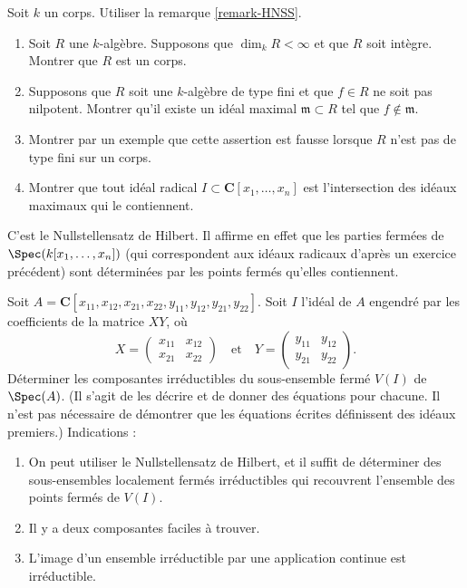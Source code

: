 \begin{exercise}
\label{exercise-Hilbert-Nullstellensatz}
Soit $k$ un corps. Utiliser la remarque \ref{remark-HNSS}.
\begin{enumerate}
\item Soit $R$ une $k$-algèbre. Supposons que $\dim_k R < \infty$
et que $R$ soit intègre. Montrer que $R$ est un corps.
\item Supposons que $R$ soit une $k$-algèbre de type fini et que
$f\in R$ ne soit pas nilpotent. Montrer qu'il existe un idéal maximal
${\mathfrak m} \subset R$ tel que $f\not\in {\mathfrak m}$.
\item Montrer par un exemple que cette assertion est fausse lorsque $R$
n'est pas de type fini sur un corps.
\item Montrer que tout idéal radical $I \subset {\mathbf C}[x_1, \ldots, x_n]$
est l'intersection des idéaux maximaux qui le contiennent.
\end{enumerate}
\end{exercise}

\begin{remark}
\label{remark-Hilbert-Nullstellensatz}
C'est le Nullstellensatz de Hilbert. Il affirme en effet
que les parties fermées de $\Spec(k[x_1, \ldots, x_n])$
(qui correspondent aux idéaux radicaux d'après un exercice précédent)
sont déterminées par les points fermés qu'elles contiennent.
\end{remark}

\begin{exercise}
\label{exercise-product-matrices-ring}
Soit $A =
{\mathbf C}[x_{11}, x_{12}, x_{21}, x_{22}, y_{11}, y_{12}, y_{21}, y_{22}]$.
Soit $I$ l'idéal de $A$ engendré par les coefficients de la
matrice $XY$, où
$$
X = \left(
\begin{matrix}
x_{11} & x_{12}\\
x_{21} & x_{22}
\end{matrix}
\right)
\quad\text{et}\quad
Y = \left(
\begin{matrix}
y_{11} & y_{12}\\
y_{21} & y_{22}
\end{matrix}
\right).
$$
Déterminer les composantes irréductibles du sous-ensemble fermé $V(I)$ de
$\Spec(A)$.
(Il s'agit de les décrire et de donner des équations pour chacune. Il n'est pas
nécessaire de démontrer que les équations écrites définissent des idéaux premiers.) Indications :
\begin{enumerate}
\item On peut utiliser le Nullstellensatz de Hilbert, et il suffit de déterminer des
sous-ensembles localement fermés irréductibles qui recouvrent l'ensemble des points fermés de
$V(I)$.
\item Il y a deux composantes faciles à trouver.
\item L'image d'un ensemble irréductible par une application continue est
irréductible.
\end{enumerate}
\end{exercise}




